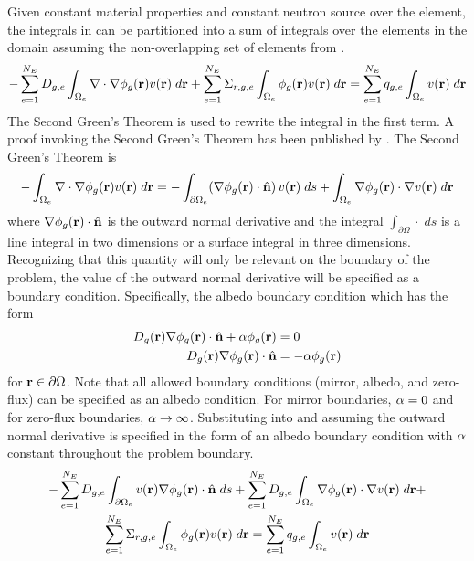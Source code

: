     Given constant material properties and constant neutron source over the
    element, the integrals in  can be partitioned into a
    sum of integrals over the elements in the domain assuming the
    non-overlapping set of elements from .
    \begin{equation} 
      \label{eq:element_by_element}
      -\sum_{e=1}^{N_E} D_{g,e} 
        \int_{\Omega_e} \mathbf{\nabla} \cdot \mathbf{\nabla} \phi_g(\mathbf{r}) v(\mathbf{r}) \; d\mathbf{r} +
        \sum_{e=1}^{N_E} \Sigma_{r,g,e} \int_{\Omega_e} \phi_g(\mathbf{r}) v(\mathbf{r}) 
        \;d\mathbf{r} = \sum_{e=1}^{N_E} q_{g,e} \int_{\Omega_e} v(\mathbf{r}) 
        \; d\mathbf{r}
    \end{equation}
    The Second Green's Theorem is used to rewrite the integral in the first
    term. A proof invoking the Second Green's Theorem has been published by
    \textcite{textbookli}. %
    The Second Green's Theorem is 
    \begin{equation} 
      \label{eq:greens}
      -\int_{\Omega_e} \mathbf{\nabla} \cdot \mathbf{\nabla} \phi_g(\mathbf{r}) v(\mathbf{r}) \;d\mathbf{r} =
        -\int_{\partial \Omega_e}  
        (\mathbf{\nabla} \phi_g(\mathbf{r}) \cdot \hat{\mathbf{n}}) \, v(\mathbf{r})\; ds +
        \int_{\Omega_e} \mathbf{\nabla} \phi_g(\mathbf{r}) \cdot \mathbf{\nabla} v(\mathbf{r}) \; d\mathbf{r}
    \end{equation}
    where $\mathbf{\nabla} \phi_g(\mathbf{r}) \cdot \hat{\mathbf{n}}$ is the outward normal derivative and
    the integral $\int_{\partial \Omega} {\cdot} \;ds$ is a line integral in two
    dimensions or a surface integral in three dimensions. Recognizing that this
    quantity will only be relevant on the boundary of the problem, the value of
    the outward normal derivative will be specified as a boundary condition.
    Specifically, the albedo boundary condition which has the form 
    \begin{align}
      D_g(\mathbf{r}) \mathbf{\nabla} \phi_g(\mathbf{r}) \cdot \hat{\mathbf{n}} + \alpha \phi_g(\mathbf{r}) &= 0 \\
      D_g(\mathbf{r}) \mathbf{\nabla} \phi_g(\mathbf{r}) \cdot \hat{\mathbf{n}} &= -\alpha \phi_g(\mathbf{r})
    \end{align}
    for $\mathbf{r} \in \partial \Omega$. Note that all allowed boundary conditions
    (mirror, albedo, and zero-flux) can be specified as an albedo condition. For
    mirror boundaries, $\alpha = 0$ and for zero-flux boundaries, $\alpha
    \rightarrow \infty$.  Substituting  into
     and assuming the outward normal derivative is
    specified in the form of an albedo boundary condition with $\alpha$
    constant throughout the problem boundary.
    \begin{multline} 
      -\sum_{e=1}^{N_E} D_{g,e} \int_{\partial \Omega_e} v(\mathbf{r}) \mathbf{\nabla}
      \phi_g(\mathbf{r}) \cdot \hat{\mathbf{n}} \;ds + \sum_{e=1}^{N_E} 
        D_{g,e} \int_{\Omega_e} \mathbf{\nabla} \phi_g(\mathbf{r}) \cdot \mathbf{\nabla} v(\mathbf{r}) 
        \; d\mathbf{r} + \\
        \sum_{e=1}^{N_E} \Sigma_{r,g,e} \int_{\Omega_e} \phi_g(\mathbf{r}) v(\mathbf{r}) 
        \; d\mathbf{r} =
        \sum_{e=1}^{N_E} q_{g,e} \int_{\Omega_e} v(\mathbf{r}) \; d\mathbf{r}
    \end{multline}
